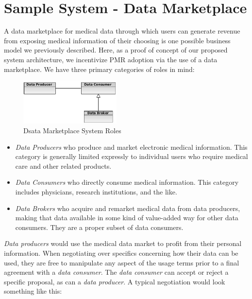 \documentclass[10pt, conference, compsocconf]{IEEEtran}
\begin{document}
\section{Sample System - Data Marketplace}
A data marketplace for medical data through which users can generate revenue from exposing medical information of their choosing is one possible business model we previously described.  Here, as a proof of concept of our proposed system architecture, we incentivize PMR adoption via the use of a data marketplace.  We have three primary categories of roles in mind:

\begin{figure}[!t]
\centering
\includegraphics[width=2in]{roles}
\caption{Dsata Marketplace System Roles}
\label{fig:SysRoles}
\end{figure}

\begin{itemize}

\item \textit{Data Producers} who produce and market electronic medical information.  This category is generally limited expressly to individual users who require medical care and other related products.

\item \textit{Data Consumers} who directly consume medical information.  This category includes physicians, research institutions, and the like.

\item \textit{Data Brokers} who acquire and remarket medical data from data producers, making that data available in some kind of value-added way for other data consumers.  They are a proper subset of data consumers.

\end{itemize}

\textit{Data producers} would use the medical data market to profit from their personal information.  When negotiating over specifics concerning how their data can be used, they are free to manipulate any aspect of the usage terms prior to a final agreement with a \textit{data consumer}.  The \textit{data consumer} can accept or reject a specific proposal, as can a \textit{data producer}.  A typical negotiation would look something like this:
\end{document}
